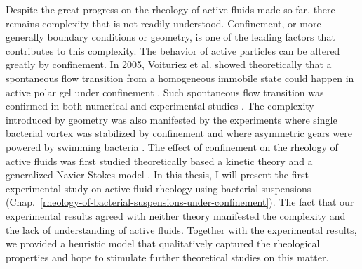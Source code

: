 Despite the great progress on the rheology of active fluids made so far, there remains complexity that is not readily understood. Confinement, or more generally boundary conditions or geometry, is one of the leading factors that contributes to this complexity. The behavior of active particles can be altered greatly by confinement. In 2005, Voituriez et al. showed theoretically that a spontaneous flow transition from a homogeneous immobile state could happen in active polar gel under confinement \cite{Voituriez2005}. Such spontaneous flow transition was confirmed in both numerical and experimental studies \cite{Ravnik2013, Wioland2016, Wu2017}. The complexity introduced by geometry was also manifested by the experiments where single bacterial vortex was stabilized by confinement \cite{Woodhouse2012, Wioland2013, Lushi2014} and where asymmetric gears were powered by swimming bacteria
\cite{Sokolov2010, Hamby2018}. The effect of confinement on the rheology of active fluids was first studied theoretically based a kinetic theory \cite{Alonso-Matilla2016} and a generalized Navier-Stokes model \cite{Slomka2017}. In this thesis, I will present the first experimental study on active fluid rheology using bacterial suspensions
(Chap.~\ref{rheology-of-bacterial-suspensions-under-confinement}). The fact that our experimental results agreed with neither theory manifested the complexity and the lack of understanding of active fluids. Together with the experimental results, we provided a heuristic model that qualitatively captured the rheological properties and hope to stimulate further theoretical studies on this matter.

